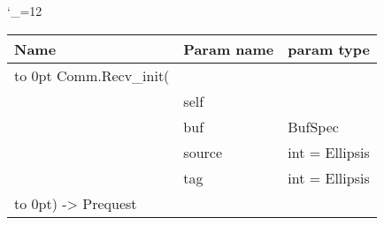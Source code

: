 \begingroup \catcode`\_=12 \tt
\begin{tabular}{lll}
\toprule
\textrm{Name}&\textrm{Param name}&\textrm{param type}\\
\midrule
\hbox to 0pt {Comm.Recv_init(\hss}\\
& self\\
& buf & BufSpec\\
& source & int = Ellipsis\\
& tag & int = Ellipsis\\
\hbox to 0pt{) -> Prequest\hss}\\
\bottomrule
\end{tabular}
\endgroup

